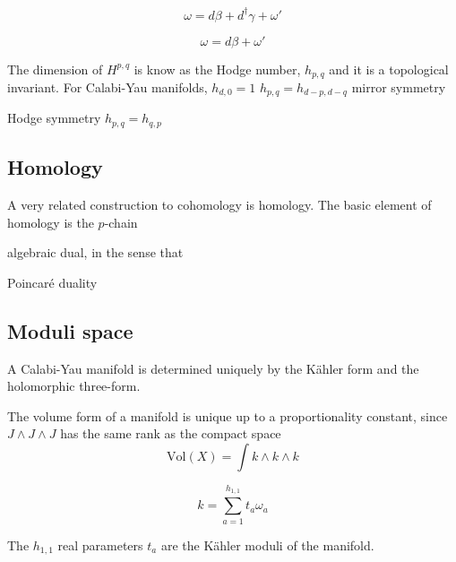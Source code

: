 \begin{equation}
  \omega = d\beta + d^\dagger \gamma +\omega'
\end{equation}

\begin{equation}
  \omega = d\beta + \omega'
\end{equation}

The dimension of $H^{p,q}$ is know as the Hodge number, $h_{p,q}$ and it is a topological invariant.
For Calabi-Yau manifolds, $h_{d,0}=1$
$h_{p,q}=h_{d-p,d-q}$ mirror symmetry

Hodge symmetry $h_{p,q}=h_{q,p}$

\subsection{Homology}

A very related construction to cohomology is homology.
The basic element of homology is the $p$-chain

algebraic dual, in the sense that


Poincaré duality 


\subsection{Moduli space}
%
%
%
%

A Calabi-Yau manifold is determined uniquely by the Kähler form and the holomorphic three-form.

The volume form of a manifold is unique up to a proportionality constant, since $J\wedge J\wedge J$ has
the same rank as the compact space
\begin{equation}
  \mathrm{Vol}(X)=\int k \wedge k \wedge k
\end{equation}

\begin{equation}
k=\sum_{a=1}^{h_{1,1}}t_a \omega_a
\end{equation}

The $h_{1,1}$ real parameters $t_a$ are the Kähler moduli of the manifold.


